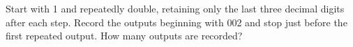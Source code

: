 Start with 1 and repeatedly double, retaining only the last three decimal digits after each step. Record the outputs beginning with 002 and stop just before the first repeated output. How many outputs are recorded?
